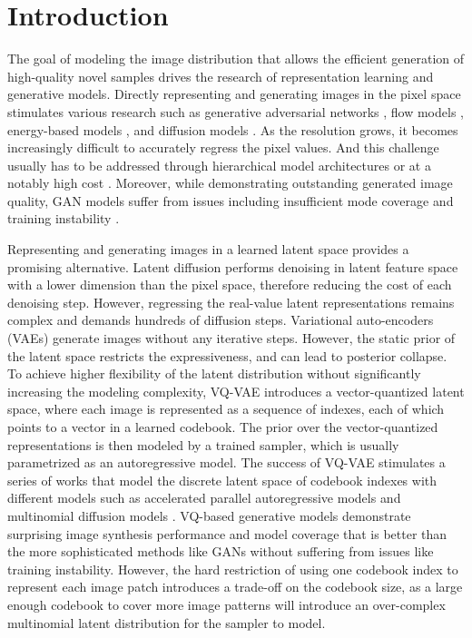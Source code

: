 \documentclass[10pt,twocolumn,letterpaper]{article}
\begin{document}
\section{Introduction}
The goal of modeling the image distribution that allows the efficient generation of high-quality novel samples drives the research of representation learning and generative models. 
Directly representing and generating images in the pixel space stimulates various research such as generative adversarial networks \cite{gan,wgan,biggan,pggan}, flow models \cite{flows,kobyzev2020normalizing,nice,papamakarios2021normalizing}, energy-based models \cite{xieebm,implicit,improved,lecunebm}, and diffusion models \cite{diffusion,ddpm,ddim,improved_ddpm}.
As the resolution grows, it becomes increasingly difficult to accurately regress the pixel values. And this challenge usually has to be addressed through hierarchical model architectures \cite{pggan,c2f} or at a notably high cost \cite{ddpm}. Moreover, while demonstrating outstanding generated image quality, GAN models suffer from issues including insufficient mode coverage \cite{metz2016unrolled} and training instability \cite{gulrajani2017improved}. 


Representing and generating images in a learned latent space \cite{latent,vae,latentebm} provides a promising alternative.
Latent diffusion \cite{latent} performs denoising in latent feature space with a lower dimension than the pixel space, therefore reducing the cost of each denoising step. However, regressing the real-value latent representations remains complex and demands hundreds of diffusion steps. 
Variational auto-encoders (VAEs) \cite{vae,betavae,rezende2014stochastic} generate images without any iterative steps. However, the static prior of the latent space restricts the expressiveness, and can lead to posterior collapse.
To achieve higher flexibility of the latent distribution without significantly increasing the modeling complexity, VQ-VAE \cite{vqvae} introduces a vector-quantized latent space, where each image is represented as a sequence of indexes, each of which points to a vector in a learned codebook. The prior over the vector-quantized representations is then modeled by a trained sampler, which is usually parametrized as an autoregressive model. The success of VQ-VAE stimulates a series of works that model the discrete latent space of codebook indexes with different models such as accelerated parallel autoregressive models \cite{maskgit} and multinomial diffusion models \cite{unleashing,vqdiff}.
VQ-based generative models demonstrate surprising image synthesis performance and model coverage that is better than the more sophisticated methods like GANs without suffering from issues like training instability. 
However, the hard restriction of using one codebook index to represent each image patch introduces a trade-off on the codebook size, as a large enough codebook to cover more image patterns will introduce an over-complex multinomial latent distribution for the sampler to model.
\end{document}
